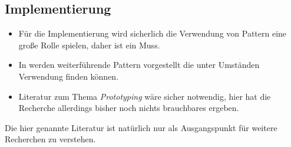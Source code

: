 \documentclass[12pt,headsepline,a4paper,bibtotoc,liststotoc,DIV12,BCOR12mm]{scrartcl}
\begin{document}

\subsection{Implementierung} %
\label{sub:implementierung}

  \begin{itemize}
    \item Für die Implementierung wird sicherlich die Verwendung von Pattern eine große Rolle spielen, daher ist \citep{design_patterns} ein Muss.
    \item In \citep{patterns_of_enterprise_application_architecture} werden weiterführende Pattern vorgestellt die unter Umständen Verwendung finden können.
    \item Literatur zum Thema \emph{Prototyping} wäre sicher notwendig, hier hat die Recherche allerdings bisher noch nichts brauchbares ergeben.
  \end{itemize}


  Die hier genannte Literatur ist natürlich nur als Ausgangspunkt für weitere Recherchen zu verstehen.



% 


\end{document}
